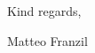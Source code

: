 \documentclass[paper=a4]{../../_global/texMemo}
\begin{document}
\maketitle

Kind regards,

Matteo Franzil
\end{document}
